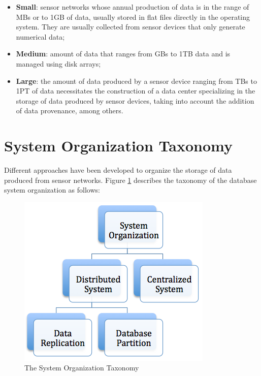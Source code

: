 \begin{itemize}
  \item \textbf{Small}: sensor networks whose annual production of data is in the
  range of MBs or to 1GB of data, usually stored in flat files directly in the
  operating system. They are usually collected from sensor devices that only
  generate numerical data;
  \item \textbf{Medium}: amount of data that ranges from GBs to 1TB data and is 
  managed using disk arrays;
  \item \textbf{Large}: the amount of data produced by a sensor device ranging 
  from TBs to 1PT of data necessitates the construction of a data center 
  specializing in the storage of data produced by sensor devices, taking into 
  account the addition of data provenance, among others.
\end{itemize}

\section{System Organization Taxonomy} 

Different approaches have been developed to organize the storage of data
produced from sensor networks. Figure \ref{fig:taxonomy-database-architecture} 
describes the taxonomy of the database system organization as follows:

\begin{figure}[h]
  \centering
  \includegraphics[scale=0.5]{../diagrams/taxonomy-database-architecture}
  \caption{The System Organization Taxonomy}
  \label{fig:taxonomy-database-architecture}
\end{figure}

